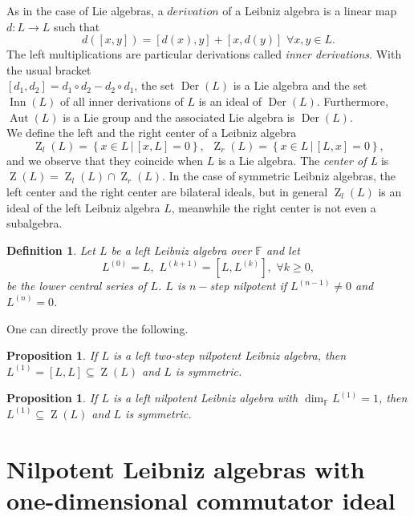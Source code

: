 \documentclass[english,4paper,10pt]{article}
\newcommand{\F}{\mathbb{F}}
\newtheorem{definition}[thm]{Definition}
\newtheorem{prop}[thm]{Proposition}
\begin{document}
	  As in the case of Lie algebras, a $derivation$ of a Leibniz algebra is a linear map $d\colon L\rightarrow L$ such that 
	 $$
	 d(\left[x,y\right])=\left[d(x),y\right]+\left[x,d(y)\right]\,\,\forall x,y\in L.
	 $$
	The left multiplications are particular derivations called \emph{inner derivations}. With the usual bracket\\ \hbox{$\left[d_1,d_2\right]=d_1\circ d_2 - d_2\circ d_1$}, the set $\operatorname{Der}(L)$ is a Lie algebra and the set  $\operatorname{Inn}(L)$ of all inner derivations of $L$ is an ideal of $\operatorname{Der}(L)$. Furthermore, $\operatorname{Aut}(L)$ is a Lie group and the associated Lie algebra is $\operatorname{Der}(L)$. \\
	
	We define the left and the right center of a Leibniz algebra
	$$
	\operatorname{Z}_l(L)=\left\{x\in L \,|\,\left[x,L\right]=0\right\},\,\,\, \operatorname{Z}_r(L)=\left\{x\in L \,|\,\left[L,x\right]=0\right\},
	$$
	and we observe that they coincide when $L$ is a Lie algebra. The \emph{center of L} is $\operatorname{Z}(L)=\operatorname{Z}_l(L)\cap \operatorname{Z}_r(L)$. In the case of symmetric Leibniz algebras, the left center and the right center are bilateral ideals, but in general $\operatorname{Z}_l(L)$ is an ideal of the left Leibniz algebra $L$, meanwhile the right center is not even a subalgebra.
	
	\begin{definition}
	Let $L$ be a left Leibniz algebra over $\F$ and let
	$$
	L^{(0)}=L,\,\,L^{(k+1)}=[L,L^{(k)}],\,\,\forall k\geq0,
	$$ be the \emph{lower central series of $L$}. $L$ is \emph{$n-$step nilpotent} if $L^{(n-1)}\neq0$ and $L^{(n)}=0$.
	\end{definition}

One can directly prove the following.

\begin{prop}
If $L$ is a left two-step nilpotent Leibniz algebra, then $L^{(1)}=[L,L]\subseteq \operatorname{Z}(L)$ and $L$ is symmetric.
\end{prop}

\begin{prop}
	If $L$ is a left nilpotent Leibniz algebra with $\dim_\F L^{(1)}=1$, then  $L^{(1)}\subseteq \operatorname{Z}(L)$ and $L$ is symmetric.
\end{prop}
	
	\section{Nilpotent Leibniz algebras with one-dimensional commutator ideal}
\end{document}
